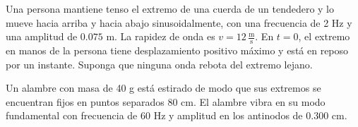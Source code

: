 \documentclass[addpoints]{exam}
\begin{document}
\begin{questions}
    \pagebreak

    \question Una persona mantiene tenso el extremo de una cuerda de un tendedero y lo mueve hacia arriba y hacia abajo sinusoidalmente, con una frecuencia de 2 Hz y una amplitud de $0.075$ m. La rapidez de onda es $v = 12 \, \frac{\text{m}}{\text{s}}$. En $t = 0$, el extremo en manos de la persona tiene desplazamiento positivo máximo y está en reposo por un instante. Suponga que ninguna onda rebota del extremo lejano. 

    \question Un alambre con masa de 40 g está estirado de modo que sus extremos se encuentran fijos en puntos separados 80 cm. El alambre vibra en su modo fundamental con frecuencia de 60 Hz y amplitud en los antinodos de 0.300 cm. 

\end{questions}
\end{document}
